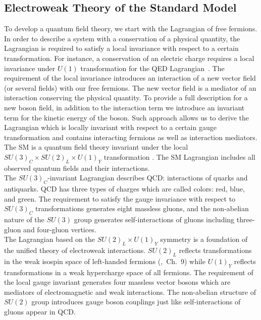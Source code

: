 \subsection{Electroweak Theory of the Standard Model}
\label{sec:WgAbout_SMEWK}

To develop a quantum field theory, we start with the Lagrangian of free fermions. In order to describe a system with a conservation of a physical quantity, the Lagrangian is required to satisfy a local invariance with respect to a certain transformation. For instance, a conservation of an electric charge requires a local invariance under $U(1)$ transformation for the QED Lagrangian~\cite{ref_Pich}. The requirement of the local invariance introduces an interaction of a new vector field (or several fields) with our free fermions. The new vector field is a mediator of an interaction conserving the physical quantity. To provide a full description for a new boson field, in addition to the interaction term we introduce an invariant term for the kinetic energy of the boson. Such approach allows us to derive the Lagrangian which is locally invariant with respect to a certain gauge transformation and contains interacting fermions as well as interaction mediators. \\ 

The SM is a quantum field theory invariant under the local $SU(3)_C \times SU(2)_L \times U(1)_Y$ transformation \cite{ref_Pich}. The SM Lagrangian includes all observed quantum fields and their interactions. \\ 

The $SU(3)_C$-invariant Lagrangian describes QCD: interactions of quarks and antiquarks. QCD has three types of charges which are called colors: red, blue, and green. The requirement to satisfy the gauge invariance with respect to $SU(3)_C$ transformations generates eight massless gluons, and the non-abelian nature of the $SU(3)$ group generates self-interactions of gluons including three-gluon and four-gluon vertices.\\

The Lagrangian based on the $SU(2)_L \times U(1)_Y$ symmetry is a foundation of the unified theory of electroweak interactions. $SU(2)_L$ reflects transformations in the weak isospin space of left-handed fermions (\cite{ref_Griffiths},~Ch.~9) while $U(1)_Y$ reflects transformations in a weak hypercharge space of all fermions. The requirement of the local gauge invariant generates four massless vector bosons which are mediators of electromagnetic and weak interactions. The non-abelian structure of $SU(2)$ group introduces gauge boson couplings just like self-interactions of gluons appear in QCD.\\ 

